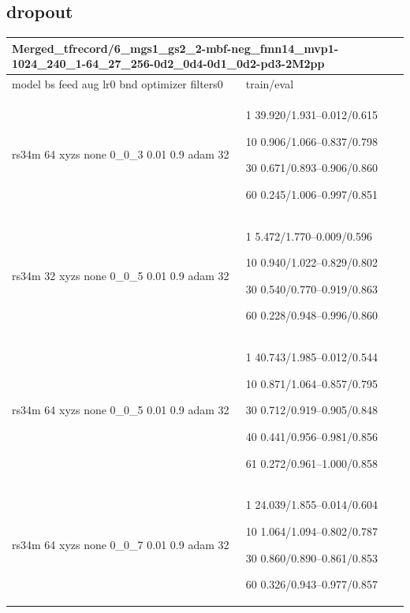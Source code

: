 \documentclass[,table,dvipsnames]{article}
\begin{document}
\subsection{dropout}
\noindent\begin{tabular}{|p{9cm}|p{6cm}| }	
	\hline
	\multicolumn{2}{|p{15cm}|}{Merged\_tfrecord/6\_mgs1\_gs2\_2-mbf-neg\_fmn14\_mvp1-1024\_240\_1-64\_27\_256-0d2\_0d4-0d1\_0d2-pd3-2M2pp}\\
	\hline
	model bs feed aug lr0 bnd optimizer filters0 & train/eval \\
	
	\rowcolor{green!20}
	rs34m 64 xyzs none 0\_0\_3 0.01 0.9 adam 32 & 1 39.920/1.931--0.012/0.615\par 10 0.906/1.066--0.837/0.798\par \par 30 0.671/0.893--0.906/0.860\par 60 0.245/1.006--0.997/0.851 \\
	
	\rowcolor{yellow!20}
	rs34m 32 xyzs none 0\_0\_5 0.01 0.9 adam 32& 1 5.472/1.770--0.009/0.596\par 10 0.940/1.022--0.829/0.802\par 30 0.540/0.770--0.919/0.863\par 60 0.228/0.948--0.996/0.860\\
	
	\rowcolor{blue!20}
	rs34m 64 xyzs none 0\_0\_5 0.01 0.9 adam 32& 1 40.743/1.985--0.012/0.544\par 10 0.871/1.064--0.857/0.795\par 30 0.712/0.919--0.905/0.848\par 40 0.441/0.956--0.981/0.856\par 61 0.272/0.961--1.000/0.858\\
	
	\rowcolor{orange!20}
	rs34m 64 xyzs none  0\_0\_7 0.01 0.9 adam 32& 1 24.039/1.855--0.014/0.604\par 10 1.064/1.094--0.802/0.787\par 30 0.860/0.890--0.861/0.853\par 60 0.326/0.943--0.977/0.857\\
		
\hline
\end{tabular}
\end{document}
